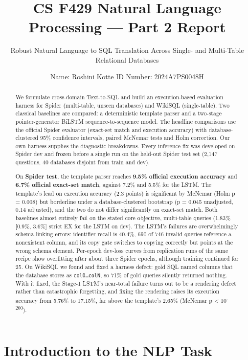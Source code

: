 \documentclass[
  10pt,
]{article}
\title{\textbf{CS F429 Natural Language Processing --- Part 2 Report}}
\subtitle{Robust Natural Language to SQL Translation Across Single- and
Multi-Table Relational Databases}
\author{Name: Roshini Kotte \textbar{} ID Number: 2024A7PS0048H}
\date{}
\newcounter{none} %
\begin{document}
\maketitle
\begin{abstract}
We formulate cross-domain Text-to-SQL and build an execution-based
evaluation harness for Spider (multi-table, unseen databases) and
WikiSQL (single-table). Two classical baselines are compared: a
deterministic template parser and a two-stage pointer-generator BiLSTM
sequence-to-sequence model. The headline comparisons use the official
Spider evaluator (exact-set match and execution accuracy) with
database-clustered 95\% confidence intervals, paired McNemar tests and
Holm correction. Our own harness supplies the diagnostic breakdowns.
Every inference fix was developed on Spider dev and frozen before a
single run on the held-out Spider test set (2,147 questions, 40
databases disjoint from train and dev).

On \textbf{Spider test}, the template parser reaches \textbf{9.5\%
official execution accuracy} and \textbf{6.7\% official exact-set
match}, against 7.2\% and 5.5\% for the LSTM. The template's lead on
execution accuracy (2.3 points) is significant by McNemar (Holm p =
0.008) but borderline under a database-clustered bootstrap (p = 0.045
unadjusted, 0.14 adjusted), and the two do not differ significantly on
exact-set match. Both baselines almost entirely fail on the stated core
objective, multi-table queries (1.83\% {[}0.9\%, 3.6\%{]} strict EX for
the LSTM on dev). The LSTM's failures are overwhelmingly schema-linking
errors: identifier recall is 40.4\%, 690 of 746 invalid queries
reference a nonexistent column, and its copy gate switches to copying
correctly but points at the wrong schema element. Per-epoch dev-loss
curves from replication runs of the same recipe show overfitting after
about three Spider epochs, although training continued for 25. On
WikiSQL we found and fixed a harness defect: gold SQL named columns that
the database stores as \texttt{col0…colN}, so 71\% of gold queries
silently returned nothing. With it fixed, the Stage-1 LSTM's near-total
failure turns out to be a rendering defect rather than catastrophic
forgetting, and fixing the rendering raises its execution accuracy from
5.76\% to 17.15\%, far above the template's 2.65\% (McNemar p
\textless{} 10\textsuperscript{-200}).
\end{abstract}

\section{Introduction to the NLP
Task}\label{introduction-to-the-nlp-task}
\end{document}

